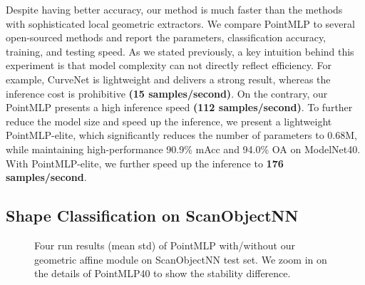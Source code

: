 \documentclass{article} \usepackage{iclr2022_conference,times}
\begin{document}
Despite having better accuracy, our method is much faster than the methods with sophisticated local geometric extractors. We compare PointMLP to several open-sourced methods and report the parameters, classification accuracy, training, and testing speed. As we stated previously, a key intuition behind this experiment is that model complexity can not directly reflect efficiency. For example, CurveNet is lightweight and delivers a strong result, whereas the inference cost is prohibitive \textbf{(15 samples/second)}. On the contrary, our PointMLP presents a high inference speed \textbf{(112 samples/second)}. To further reduce the model size and speed up the inference, we present a lightweight PointMLP-elite, which significantly reduces the number of parameters to 0.68M, while maintaining high-performance 90.9\% mAcc and 94.0\% OA on ModelNet40. With PointMLP-elite, we further speed up the inference to \textbf{176 samples/second}.





\subsection{Shape Classification on ScanObjectNN}
\begin{figure}[!t]
    \centering
    \caption{Four run results (mean  std) of PointMLP with/without our geometric affine module on ScanObjectNN test set. We zoom in on the details of PointMLP40 to show the stability difference.}
    \label{fig:affine_module}
\end{figure}
\end{document}
